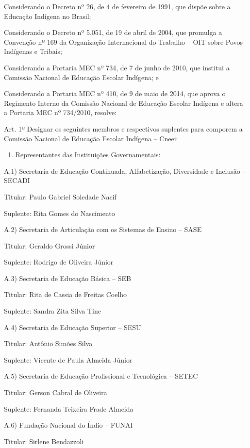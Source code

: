 \documentclass[
]{book}
\providecommand{\tightlist}{%
  \setlength{\itemsep}{0pt}\setlength{\parskip}{0pt}}
\begin{document}
Considerando o Decreto nº 26, de 4 de fevereiro de 1991, que dispõe sobre a Educação Indígena no Brasil;

Considerando o Decreto nº 5.051, de 19 de abril de 2004, que promulga a Convenção nº 169 da Organização Internacional do Trabalho -- OIT sobre Povos Indígenas e Tribais;

Considerando a Portaria MEC nº 734, de 7 de junho de 2010, que institui a Comissão Nacional de Educação Escolar Indígena; e

Considerando a Portaria MEC nº 410, de 9 de maio de 2014, que aprova o Regimento Interno da Comissão Nacional de Educação Escolar Indígena e altera a Portaria MEC nº 734/2010, resolve:

Art. 1º Designar os seguintes membros e respectivos suplentes para comporem a Comissão Nacional de Educação Escolar Indígena -- Cneei:

\begin{enumerate}
\def\labelenumi{\Alph{enumi})}
\tightlist
\item
  Representantes das Instituições Governamentais:
\end{enumerate}

A.1) Secretaria de Educação Continuada, Alfabetização, Diversidade e Inclusão -- SECADI

Titular: Paulo Gabriel Soledade Nacif

Suplente: Rita Gomes do Nascimento

A.2) Secretaria de Articulação com os Sistemas de Ensino -- SASE

Titular: Geraldo Grossi Júnior

Suplente: Rodrigo de Oliveira Júnior

A.3) Secretaria de Educação Básica -- SEB

Titular: Rita de Cassia de Freitas Coelho

Suplente: Sandra Zita Silva Tine

A.4) Secretaria de Educação Superior -- SESU

Titular: Antônio Simões Silva

Suplente: Vicente de Paula Almeida Júnior

A.5) Secretaria de Educação Profissional e Tecnológica -- SETEC

Titular: Gerson Cabral de Oliveira

Suplente: Fernanda Teixeira Frade Almeida

A.6) Fundação Nacional do Índio -- FUNAI

Titular: Sirlene Bendazzoli
\end{document}
